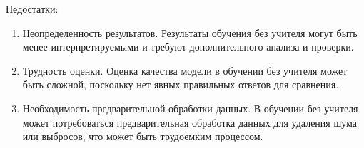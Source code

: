 \documentclass[bachelor, och, referat]{SCWorks}
\begin{document}
Недостатки:
\begin{enumerate}
    \item Неопределенность результатов. Результаты обучения без учителя могут быть менее интерпретируемыми и требуют дополнительного анализа и проверки.
    \item Трудность оценки. Оценка качества модели в обучении без учителя может быть сложной, поскольку нет явных правильных ответов для сравнения.
    \item Необходимость предварительной обработки данных. В обучении без учителя может потребоваться предварительная обработка данных для удаления шума или выбросов, что может быть трудоемким процессом.
\end{enumerate}
\end{document}
